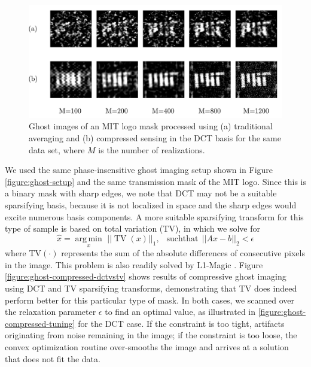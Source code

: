 \begin{figure}[t]
\begin{center}
\includegraphics[width=16cm]{figure-ghost-compressed-bszl1.pdf}
\caption{Ghost images of an MIT logo mask processed using (a) traditional averaging and (b) compressed sensing in the DCT basis for the same data set, where $M$ is the number of realizations.}
\label{figure:ghost-compressed-bszl1}
\end{center}
\end{figure}

We used the same phase-insensitive ghost imaging setup shown in Figure \ref{figure:ghost-setup} and the same transmission mask of the MIT logo. Since this is a binary mask with sharp edges, we note that DCT may not be a suitable sparsifying basis, because it is not localized in space and the sharp edges would excite numerous basis components. A more suitable sparsifying transform for this type of sample is based on total variation (TV), in which we solve for
\begin{equation}
\hat{x} = \underset{x}{\operatorname{arg\,min}}\,\,||\operatorname{TV}\left(x\right)||_1,\,\,\, \operatorname{such that}\,||Ax - b||_2<\epsilon
\end{equation}
where TV$\left(\cdot\right)$ represents the sum of the absolute differences of consecutive pixels in the image. This problem is also readily solved by L1-Magic \cite{l1magic}. Figure \ref{figure:ghost-compressed-dctvstv} shows results of compressive ghost imaging using DCT and TV sparsifying transforms, demonstrating that TV does indeed perform better for this particular type of mask. In both cases, we scanned over the relaxation parameter $\epsilon$ to find an optimal value, as illustrated in \ref{figure:ghost-compressed-tuning} for the DCT case. If the constraint is too tight, artifacts originating from noise remaining in the image; if the constraint is too loose, the convex optimization routine over-smooths the image and arrives at a solution that does not fit the data.


